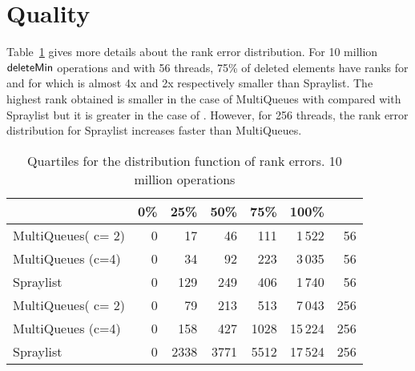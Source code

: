 \documentclass[a4paper,12pt]{article}
\newcommand{\Id}[1]{\ensuremath{\text{{\sf #1}}}}
\begin{document}
\section{Quality}
Table~\ref{tab:quality} gives more details about the rank error distribution. For 10 million \Id{deleteMin} operations and with 56 threads, 75\% of deleted elements have ranks  for  and  for  which is almost 4x and 2x respectively smaller than Spraylist. The highest rank obtained is smaller in the case of MultiQueues with  compared with Spraylist but it is greater in the case of . However, for 256 threads, the rank error distribution for Spraylist increases faster than MultiQueues.
\begin{table}[h]
\centering
  \begin{tabular}{ l | r   r   r   r  r| r}
    \hline
 \ & 0\% & 25\% & 50\% & 75\% & 100\% & \\ 
    \hline
MultiQueues( c= 2) & 0 & 17  & 46 & 111 & 1\,522 & 56 \\
MultiQueues (c=4) & 0 & 34 & 92 & 223 & 3\,035 & 56\\
Spraylist & 0 & 129 & 249 & 406 & 1\,740 & 56\\\hline
MultiQueues( c= 2) & 0 & 79 & 213 & 513 & 7\,043 & 256\\

MultiQueues (c=4) & 0 & 158 & 427 & 1028 & 15\,224 & 256\\

Spraylist & 0 & 2338 & 3771 & 5512 & 17\,524 & 256\\
    \hline
  \end{tabular}
\caption{Quartiles for the distribution function of rank errors. 10 million operations} \label{tab:quality56} 
\label{tab:quality}
\end{table}
\end{document}
